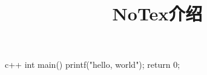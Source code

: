 \documentclass{NoTex}
\begin{document}
\title{NoTex介绍}
\maketitle

\begin{code}{c++}
int main() {
  printf("hello, world\n");
  return 0;
}
\end{code}
\end{document}
